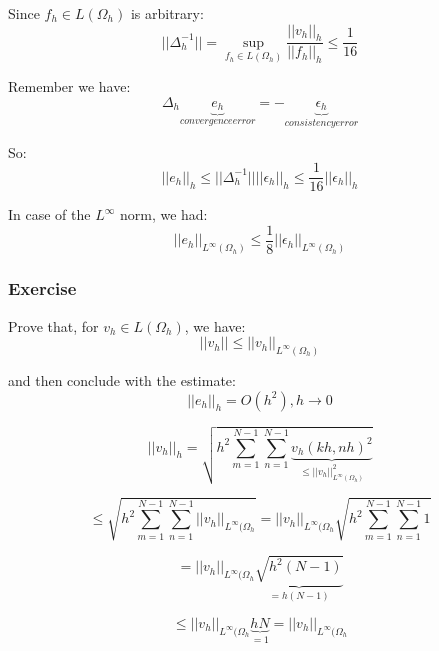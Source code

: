 Since $f_h \in L(\Omega_h)$ is arbitrary:
\begin{equation*}
||\Delta_h^{-1}|| = \sup_{f_h \in L(\Omega_h)} \frac{||v_h||_h}{||f_h||_h} \le \frac{1}{16}
\end{equation*}

Remember we have:
\begin{equation*}
\Delta_h \underbrace{e_h}_{convergence error} = - \underbrace{\epsilon_h}_{consistency error}
\end{equation*}

So:
\begin{equation*}
||e_h||_h \le ||\Delta_h^{-1}|| ||\epsilon_h||_h \le \frac{1}{16} ||\epsilon_h||_h
\end{equation*}

In case of the $L^\infty$ norm, we had:
\begin{equation*}
||e_h||_{L^\infty(\Omega_h)} \le \frac{1}{8} ||\epsilon_h||_{L^\infty(\Omega_h)}
\end{equation*}


\subsubsection{Exercise}

Prove that, for $v_h \in L(\Omega_h)$, we have:
\begin{equation*}
||v_h|| \le ||v_h||_{L^\infty(\Omega_h)}
\end{equation*}

and then conclude with the estimate:
\begin{equation*}
||e_h||_h = O(h^2), h \rightarrow 0
\end{equation*}

\begin{equation*}
||v_h||_h = \sqrt{h^2 \sum_{m=1}^{N-1} \sum_{n=1}^{N-1} \underbrace{v_h(kh, nh)^2}_{\le ||v_h||_{L^\infty(\Omega_h)}^2}}
\end{equation*}

\begin{equation*}
\le \sqrt{h^2 \sum_{m=1}^{N-1} \sum_{n=1}^{N-1} ||v_h||_{L^\infty(\Omega_h} } = ||v_h||_{L^\infty(\Omega_h} \sqrt{h^2 \sum_{m=1}^{N-1} \sum_{n=1}^{N-1} 1}
\end{equation*}

\begin{equation*}
= ||v_h||_{L^\infty(\Omega_h} \underbrace{\sqrt{h^2 (N-1)}}_{= h (N-1)}
\end{equation*}

\begin{equation*}
\le ||v_h||_{L^\infty(\Omega_h} \underbrace{h N}_{= 1} = ||v_h||_{L^\infty(\Omega_h}
\end{equation*}

